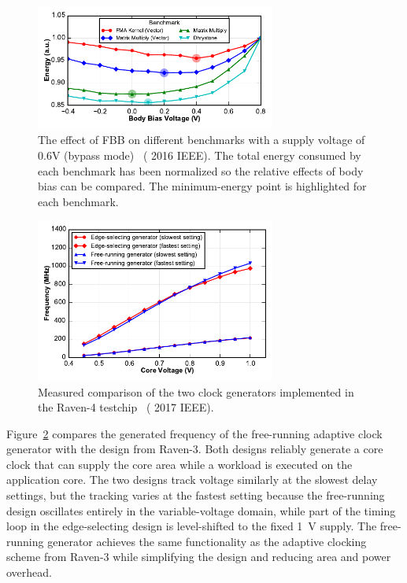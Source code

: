 \documentclass[graybox]{svmult}
\begin{document}
\begin{figure}
  \centering
  \includegraphics[width=0.7\textwidth]{6-raven4-fbb}
  \caption{The effect of FBB on different benchmarks with a supply voltage of 0.6V (bypass mode)~\cite{Keller2016} ({\textcopyright} 2016 IEEE).  The total energy consumed by each benchmark has been normalized so the relative effects of body bias can be compared.  The minimum-energy point is highlighted for each benchmark.}
  \label{fig:6-raven4-fbb}
\end{figure}

\begin{figure}
  \centering
  \includegraphics[width=0.7\textwidth]{6-raven4-clockgen}
  \caption{Measured comparison of the two clock generators implemented in the Raven-4 testchip~\cite{Keller2017} ({\textcopyright} 2017 IEEE).}
  \label{fig:6-raven4-clockgen}
\end{figure}

Figure~\ref{fig:6-raven4-clockgen} compares the generated frequency of the free-running adaptive clock generator with the design from Raven-3.
Both designs reliably generate a core clock that can supply the core area while a workload is executed on the application core.
The two designs track voltage similarly at the slowest delay settings, but the tracking varies at the fastest setting because the free-running design oscillates entirely in the variable-voltage domain, while part of the timing loop in the edge-selecting design is level-shifted to the fixed \SI{1}{\volt} supply.
The free-running generator achieves the same functionality as the adaptive clocking scheme from Raven-3 while simplifying the design and reducing area and power overhead.
\end{document}
